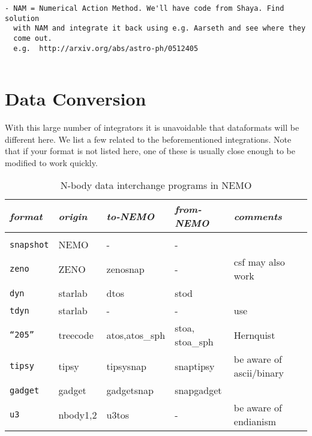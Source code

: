 {\begin{verbatim}
- NAM = Numerical Action Method. We'll have code from Shaya. Find solution
  with NAM and integrate it back using e.g. Aarseth and see where they 
  come out.
  e.g.  http://arxiv.org/abs/astro-ph/0512405
   

\end{verbatim}

\chapter                {Data Conversion}

With this large number of integrators it is unavoidable that dataformats
will be different here. We list a few related to the beforementioned
integrations. Note that if your format is not listed
here, one of these is usually close enough to be modified to work quickly.

\begin{center}
\begin{table}[h!]
\caption{N-body data interchange programs in NEMO}
\begin{tabular}{||l|l|l|l|l|l||}

\hline 
{\it format} & {\it origin} & {\it to-NEMO} & {\it from-NEMO} & {\it comments}\\
\hline &&&&\\

{\tt snapshot} & NEMO    &     -       &        -       & \\

{\tt zeno}       &    ZENO   &   zenosnap &     -       &  csf may also work \\

{\tt dyn}      & starlab &     dtos     &     stod      &  \\

{\tt tdyn}     & starlab &     -        &       -       & use  \\

{\tt ``205''}  & treecode &  atos,atos\_sph    &  stoa, stoa\_sph   &   Hernquist \\

{\tt tipsy}    &  tipsy   &    tipsysnap   & snaptipsy     &   be aware of ascii/binary \\

{\tt gadget}    &  gadget  &    gadgetsnap   & snapgadget    &   \\

{\tt u3}        & nbody1,2  &    u3tos       &    -          & be aware of endianism \\


\end{tabular}
\end{table}
\end{center}}
